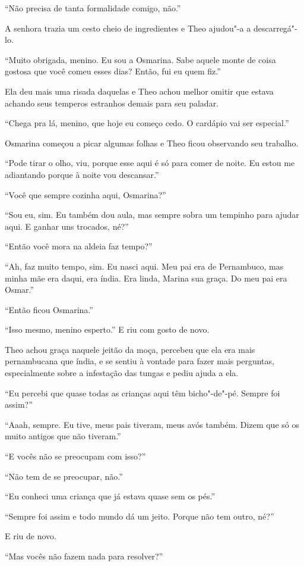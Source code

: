 ``Não precisa de tanta formalidade comigo, não.''

A senhora trazia um cesto cheio de ingredientes e Theo ajudou"-a a
descarregá"-lo.

``Muito obrigada, menino. Eu sou a Osmarina. Sabe aquele monte de coisa
gostosa que você comeu esses dias? Então, fui eu quem fiz.''

Ela deu mais uma risada daquelas e Theo achou melhor omitir que estava
achando seus temperos estranhos demais para seu paladar.

``Chega pra lá, menino, que hoje eu começo cedo. O cardápio vai ser
especial.''

Osmarina começou a picar algumas folhas e Theo ficou observando seu
trabalho.

``Pode tirar o olho, viu, porque esse aqui é só para comer de noite. Eu
estou me adiantando porque à noite vou descansar.''

``Você que sempre cozinha aqui, Osmarina?''

``Sou eu, sim. Eu também dou aula, mas sempre sobra um tempinho para
ajudar aqui. E ganhar uns trocados, né?''

``Então você mora na aldeia faz tempo?''

``Ah, faz muito tempo, sim. Eu nasci aqui. Meu pai era de Pernambuco,
mas minha mãe era daqui, era índia. Era linda, Marina sua graça. Do meu
pai era Osmar.''

``Então ficou Osmarina.''

``Isso mesmo, menino esperto.'' E riu com gosto de novo.

Theo achou graça naquele jeitão da moça, percebeu que ela era mais
pernambucana que índia, e se sentiu à vontade para fazer mais perguntas,
especialmente sobre a infestação das tungas e pediu ajuda a ela.

``Eu percebi que quase todas as crianças aqui têm bicho"-de"-pé. Sempre
foi assim?''

``Aaah, sempre. Eu tive, meus pais tiveram, meus avós também. Dizem que
só os muito antigos que não tiveram.''

``E vocês não se preocupam com isso?''

``Não tem de se preocupar, não.''

``Eu conheci uma criança que já estava quase sem os pés.''

``Sempre foi assim e todo mundo dá um jeito. Porque não tem outro, né?''

E riu de novo.

``Mas vocês não fazem nada para resolver?''

